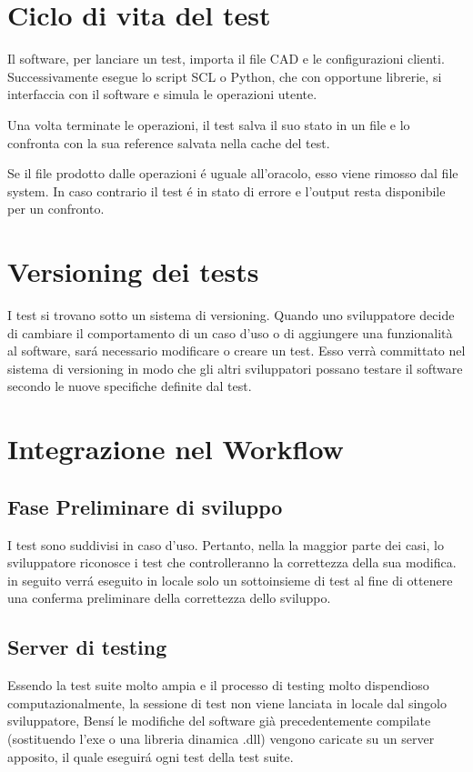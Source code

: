     \section{Ciclo di vita del test}
        Il software, per lanciare un test, importa il file CAD e le configurazioni clienti.
        Successivamente esegue lo script SCL o Python, che con opportune librerie, si interfaccia con il software
        e simula le operazioni utente. 
        
        Una volta terminate le operazioni, il test salva il suo stato in un file e lo confronta con la sua reference 
        salvata nella cache del test. 

        Se il file prodotto dalle operazioni \'e uguale all'oracolo, esso viene rimosso dal file system.
        In caso contrario il test \'e in stato di errore e l'output resta disponibile per un confronto.

    \section{Versioning dei tests}
            I test si trovano sotto un sistema di versioning.
            Quando uno sviluppatore decide di cambiare il comportamento di un caso d'uso o di aggiungere una funzionalità al software,
            sar\'a necessario modificare o creare un test.
            Esso verrà committato nel sistema di versioning in modo che gli altri sviluppatori possano testare il software secondo le nuove specifiche definite dal test.    
            
    \section{Integrazione nel Workflow}
        \subsection{Fase Preliminare di sviluppo}
            I test sono suddivisi in caso d'uso.
            Pertanto, nella la maggior parte dei casi, lo sviluppatore riconosce i test che controlleranno la correttezza della sua modifica.
            in seguito verr\'a eseguito in locale solo un sottoinsieme di test al fine di ottenere una conferma preliminare della correttezza dello sviluppo. 
        \subsection{Server di testing}
            Essendo la test suite molto ampia e il processo di testing molto dispendioso computazionalmente, 
            la sessione di test non viene lanciata in locale dal singolo sviluppatore, 
            Bens\'i  le modifiche del software già precedentemente compilate (sostituendo l’exe o una libreria dinamica .dll) 
            vengono caricate su un server apposito, il quale eseguir\'a ogni test della test suite.
            
